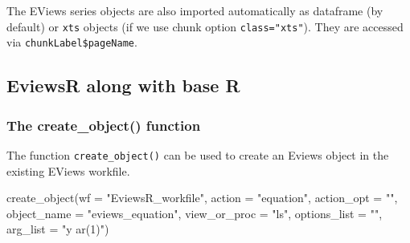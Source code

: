 \documentclass[
  letterpaper,
  DIV=11,
  numbers=noendperiod]{scrartcl}
\newenvironment{Shaded}{\begin{snugshade}}{\end{snugshade}}
\newcommand{\AttributeTok}[1]{\textcolor[rgb]{0.40,0.45,0.13}{#1}}
\newcommand{\CommentTok}[1]{\textcolor[rgb]{0.37,0.37,0.37}{#1}}
\newcommand{\FunctionTok}[1]{\textcolor[rgb]{0.28,0.35,0.67}{#1}}
\newcommand{\NormalTok}[1]{\textcolor[rgb]{0.00,0.23,0.31}{#1}}
\newcommand{\SpecialCharTok}[1]{\textcolor[rgb]{0.37,0.37,0.37}{#1}}
\newcommand{\StringTok}[1]{\textcolor[rgb]{0.13,0.47,0.30}{#1}}
\begin{document}
The EViews series objects are also imported automatically as dataframe
(by default) or \texttt{xts} objects (if we use chunk option
\texttt{class="xts"}). They are accessed via
\texttt{chunkLabel\$pageName}.

\begin{Shaded}
\end{Shaded}

\begin{figure}

\end{figure}

\hypertarget{eviewsr-along-with-base-r}{%
\subsection{EviewsR along with base R}\label{eviewsr-along-with-base-r}}

\hypertarget{the-create_object-function}{%
\subsubsection{The create\_object()
function}\label{the-create_object-function}}

The function \texttt{create\_object()} can be used to create an Eviews
object in the existing EViews workfile.

\begin{Shaded}
\begin{Highlighting}[]
\FunctionTok{create\_object}\NormalTok{(}\AttributeTok{wf =} \StringTok{"EviewsR\_workfile"}\NormalTok{, }\AttributeTok{action =} \StringTok{"equation"}\NormalTok{, }\AttributeTok{action\_opt =} \StringTok{""}\NormalTok{,}
    \AttributeTok{object\_name =} \StringTok{"eviews\_equation"}\NormalTok{, }\AttributeTok{view\_or\_proc =} \StringTok{"ls"}\NormalTok{, }\AttributeTok{options\_list =} \StringTok{""}\NormalTok{,}
    \AttributeTok{arg\_list =} \StringTok{"y ar(1)"}\NormalTok{)}
\end{Highlighting}
\end{Shaded}
\end{document}
